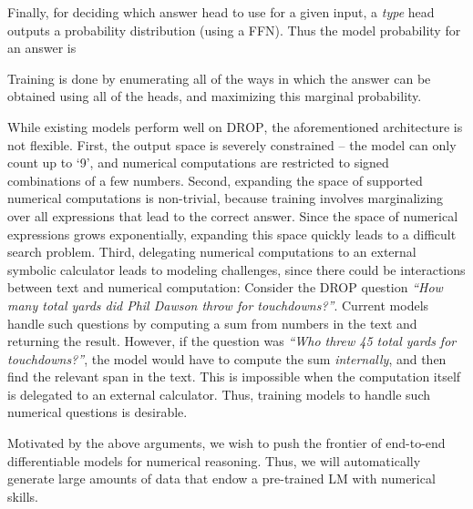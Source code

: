 \documentclass[11pt,a4paper]{article}
\newcommand\nl[1]{{\it``#1''}}
\newcommand\drop{\textsc{DROP}}
\begin{document}
Finally, for deciding which answer head to use for a
given input, a \emph{type} head  outputs
a probability distribution  (using a FFN).
Thus the model probability for an answer is 

Training is done by enumerating all of the ways in which the answer can be obtained using all of the heads, and maximizing this marginal probability.








While existing models perform well on \drop, the aforementioned architecture is not flexible. First, the output space is severely constrained -- the model can only count up to `9',
and numerical computations are restricted to signed combinations of a few numbers.
Second, expanding the space of supported numerical computations is non-trivial, because training involves marginalizing over all expressions that lead to the correct answer. Since the space of numerical expressions grows exponentially, expanding this space quickly leads to a difficult search problem.
Third, delegating numerical computations to an external symbolic calculator leads to modeling challenges, since there could be interactions between text and numerical computation:
Consider the \drop{} question 
\nl{How many total yards did Phil Dawson throw for touchdowns?}. 
Current models handle such questions by computing a sum from numbers in the text and returning the result.
However, if the question was
\nl{Who  threw  45  total  yards  for  touchdowns?}, the model would have to compute the sum \emph{internally}, and then find the relevant span in the text.  This is impossible when the computation itself is delegated to an external calculator. Thus, training models to handle such numerical questions is desirable.




Motivated by the above arguments, we wish to push the frontier of end-to-end differentiable models for numerical
reasoning. Thus, we will automatically generate large amounts of data that endow a pre-trained LM with numerical skills.
\end{document}
